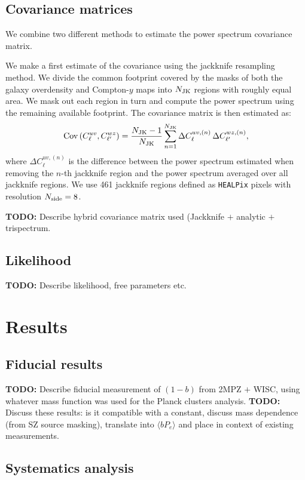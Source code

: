 \documentclass[useAMS,usenatbib]{mn2e}
\newcommand{\TODO}[1]{{\bf TODO:} #1}
\begin{document}
  \subsection{Covariance matrices}\label{ssec:methods.cov}
    We combine two different methods to estimate the power spectrum covariance matrix. 
    
    We make a first estimate of the covariance using the jackknife resampling method. We divide the common footprint covered by the masks of both the galaxy overdensity and Compton-$y$ maps into $N_{\rm JK}$ regions with roughly equal area. We mask out each region in turn and compute the power spectrum  using the remaining available footprint. The covariance matrix is then estimated as:
    \begin{equation}
      {\rm Cov}\left(C^{uv}_\ell,C^{wz}_{\ell'}\right)=\frac{N_{\rm JK}-1}{N_{\rm JK}}\sum_{n=1}^{N_{\rm JK}}\Delta C^{uv,(n)}_\ell\,\Delta C^{wz,(n)}_{\ell'},
    \end{equation}
    where $\Delta C^{uv,(n)}_\ell$ is the difference between the power spectrum estimated when removing the $n$-th jackknife region and the power spectrum averaged over all jackknife regions. We use 461 jackknife regions defined as {\tt HEALPix} pixels with resolution $N_{\rm side}=8$.

    \TODO{Describe hybrid covariance matrix used (Jackknife $+$ analytic $+$ trispectrum.}

  \subsection{Likelihood}\label{ssec:methods.like}
    \TODO{Describe likelihood, free parameters etc.}

\section{Results}\label{sec:results}
  \subsection{Fiducial results}\label{ssec:results.fid}
    \TODO{Describe fiducial measurement of $(1-b)$ from 2MPZ $+$ WISC, using whatever mass function was used for the Planck clusters analysis.}
    \TODO{Discuss these results: is it compatible with a constant, discuss mass dependence (from SZ source masking), translate into $\langle bP_e \rangle$ and place in context of existing measurements.}

  \subsection{Systematics analysis}\label{ssec:results.syst}
\end{document}

